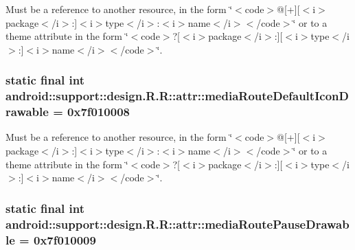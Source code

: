 Must be a reference to another resource, in the form \char`\"{}$<$code$>$@\mbox{[}+\mbox{]}\mbox{[}$<$i$>$package$<$/i$>$:\mbox{]}$<$i$>$type$<$/i$>$:$<$i$>$name$<$/i$>$$<$/code$>$\char`\"{} or to a theme attribute in the form \char`\"{}$<$code$>$?\mbox{[}$<$i$>$package$<$/i$>$:\mbox{]}\mbox{[}$<$i$>$type$<$/i$>$:\mbox{]}$<$i$>$name$<$/i$>$$<$/code$>$\char`\"{}. \hypertarget{classandroid_1_1support_1_1design_1_1_r_1_1attr_e67cd1893a663ba0ba720d3b10314fb4}{
\subsubsection[{mediaRouteDefaultIconDrawable}]{\setlength{\rightskip}{0pt plus 5cm}static final int android::support::design.R.R::attr::mediaRouteDefaultIconDrawable = 0x7f010008}}
\label{classandroid_1_1support_1_1design_1_1_r_1_1attr_e67cd1893a663ba0ba720d3b10314fb4}


Must be a reference to another resource, in the form \char`\"{}$<$code$>$@\mbox{[}+\mbox{]}\mbox{[}$<$i$>$package$<$/i$>$:\mbox{]}$<$i$>$type$<$/i$>$:$<$i$>$name$<$/i$>$$<$/code$>$\char`\"{} or to a theme attribute in the form \char`\"{}$<$code$>$?\mbox{[}$<$i$>$package$<$/i$>$:\mbox{]}\mbox{[}$<$i$>$type$<$/i$>$:\mbox{]}$<$i$>$name$<$/i$>$$<$/code$>$\char`\"{}. \hypertarget{classandroid_1_1support_1_1design_1_1_r_1_1attr_d5027c7b1b443e8cbddbcedfc9dcbc68}{
\subsubsection[{mediaRoutePauseDrawable}]{\setlength{\rightskip}{0pt plus 5cm}static final int android::support::design.R.R::attr::mediaRoutePauseDrawable = 0x7f010009}}
\label{classandroid_1_1support_1_1design_1_1_r_1_1attr_d5027c7b1b443e8cbddbcedfc9dcbc68}


